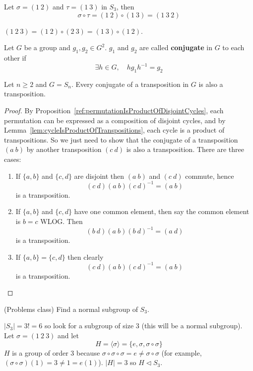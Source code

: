 \begin{example}
	Let $\sigma = (1 \ 2)$ and $\tau = (1 \ 3)$ in $S_3$, then
	\[
		\sigma \circ \tau = (1 \ 2) \circ (1 \ 3) = (1 \ 3 \ 2)
	\]
\end{example}

\begin{example}
	$(1 \ 2 \ 3) = (1 \ 2) \circ (2 \ 3) = (1 \ 3) \circ (1 \ 2)$.
\end{example}

\begin{definition}
	Let $G$ be a group and $g_1, g_2 \in G^2$. $g_1$ and $g_2$ are called \textbf{conjugate} in $G$ to each other if
	\[
		\exists h \in G, \quad h g_1 h^{-1} = g_2
	\]
\end{definition}

\begin{lemma}
	Let $n \ge 2$ and $G = S_n$. Every conjugate of a transposition in $G$ is also a transposition.
\end{lemma}

\begin{proof}
	By Proposition~\ref{ref:permutationIsProductOfDisjointCycles}, each permutation can be expressed as a composition of disjoint cycles, and by Lemma~\ref{lem:cycleIsProductOfTranspositions}, each cycle is a product of transpositions. So we just need to show that the conjugate of a transposition $(a \ b)$ by another transposition $(c \ d)$ is also a transposition. There are three cases:
	\begin{enumerate}
		\item If $\{ a, b \}$ and $\{ c, d \}$ are disjoint then $(a \ b)$ and $(c \ d)$ commute, hence
		\[
			(c \ d) (a \ b) {(c \ d)}^{-1} = (a \ b)
		\]
		is a transposition.
		\item If $\{ a, b \}$ and $\{ c, d \}$ have one common element, then say the common element is $b = c$ WLOG. Then
		\[
			(b \ d) (a \ b) {(b \ d)}^{-1} = (a \ d)
		\]
		is a transposition.
		\item If $\{ a, b \} = \{ c, d \}$ then clearly
		\[
			(c \ d) (a \ b) {(c \ d)}^{-1} = (a \ b)
		\]
		is a transposition.
	\end{enumerate}
\end{proof}

\begin{example}
	(Problems class) Find a normal subgroup of $S_3$.
	
	$|S_3| = 3! = 6$ so look for a subgroup of size $3$ (this will be a normal subgroup). Let $\sigma = (1 \ 2 \ 3)$ and let
	\[
		H = \langle \sigma \rangle = \{ e, \sigma, \sigma \circ \sigma \}
	\]
	$H$ is a group of order $3$ because $\sigma \circ \sigma \circ \sigma = e \ne \sigma \circ \sigma$ (for example, $(\sigma \circ \sigma)(1) = 3 \ne 1 = e(1)$). $|H| = 3$ so $H \triangleleft S_3$.
\end{example}

